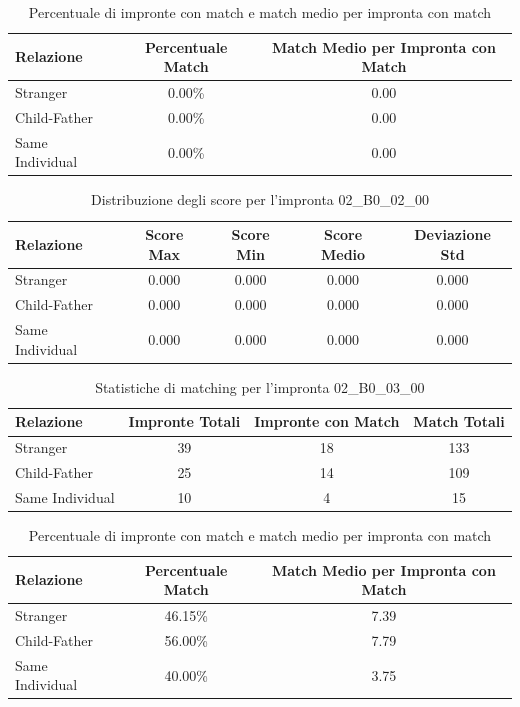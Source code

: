 \begin{table}[htbp]
\centering
\caption{Percentuale di impronte con match e match medio per impronta con match}
\label{tab:match_percentage_02_B0_02_00}
\begin{tabular}{|l|c|c|}
\hline
\textbf{Relazione} & \textbf{Percentuale Match} & \textbf{Match Medio per Impronta con Match} \\
\hline
Stranger & 0.00\% & 0.00 \\
\hline
Child-Father & 0.00\% & 0.00 \\
\hline
Same Individual & 0.00\% & 0.00 \\
\hline
\end{tabular}
\end{table}


\begin{table}[htbp]
\centering
\caption{Distribuzione degli score per l'impronta 02\_B0\_02\_00}
\label{tab:scores_02_B0_02_00}
\begin{tabular}{|l|c|c|c|c|}
\hline
\textbf{Relazione} & \textbf{Score Max} & \textbf{Score Min} & \textbf{Score Medio} & \textbf{Deviazione Std} \\
\hline
Stranger & 0.000 & 0.000 & 0.000 & 0.000 \\
\hline
Child-Father & 0.000 & 0.000 & 0.000 & 0.000 \\
\hline
Same Individual & 0.000 & 0.000 & 0.000 & 0.000 \\
\hline
\end{tabular}
\end{table}


\begin{table}[htbp]
\centering
\caption{Statistiche di matching per l'impronta 02\_B0\_03\_00}
\label{tab:results_02_B0_03_00}
\begin{tabular}{|l|c|c|c|}
\hline
\textbf{Relazione} & \textbf{Impronte Totali} & \textbf{Impronte con Match} & \textbf{Match Totali} \\
\hline
Stranger & 39 & 18 & 133 \\
\hline
Child-Father & 25 & 14 & 109 \\
\hline
Same Individual & 10 & 4 & 15 \\
\hline
\end{tabular}
\end{table}


\begin{table}[htbp]
\centering
\caption{Percentuale di impronte con match e match medio per impronta con match}
\label{tab:match_percentage_02_B0_03_00}
\begin{tabular}{|l|c|c|}
\hline
\textbf{Relazione} & \textbf{Percentuale Match} & \textbf{Match Medio per Impronta con Match} \\
\hline
Stranger & 46.15\% & 7.39 \\
\hline
Child-Father & 56.00\% & 7.79 \\
\hline
Same Individual & 40.00\% & 3.75 \\
\hline
\end{tabular}
\end{table}


